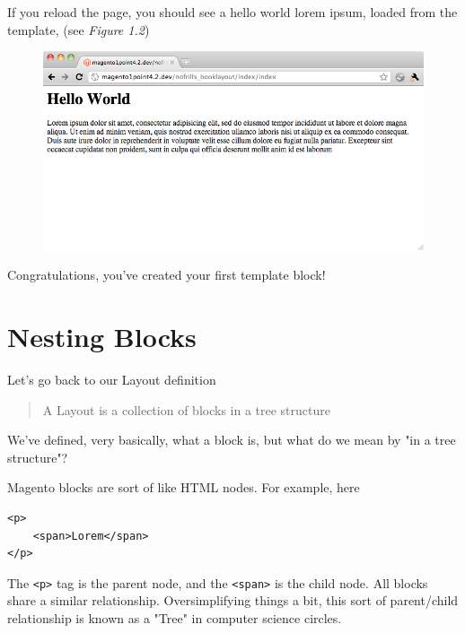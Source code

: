 \documentclass[oneside]{book}
\begin{document}
If you reload the page, you should see a hello world lorem ipsum, loaded from the template, (see \emph{Figure 1.2})

\begin{figure}[htb]
\begin{center}
\leavevmode
\includegraphics[width=1\textwidth]{images/chapter1/helloworld.png}
\end{center}
\caption{}
\end{figure}


Congratulations, you've created your first template block!

\section{Nesting Blocks}

Let's go back to our Layout definition

\begin{quote}
A Layout is a collection of blocks in a tree structure
\end{quote}

We've defined, very basically, what a block is, but what do we mean by "in a tree structure"?

Magento blocks are sort of like HTML nodes.  For example, here

\begin{lstlisting}
<p>
    <span>Lorem</span>
</p>

\end{lstlisting}


The \footnotesize\texttt{\textless p\textgreater } \normalsize  tag is the parent node, and the \footnotesize\texttt{\textless span\textgreater } \normalsize  is the child node.  All blocks share a similar relationship.  Oversimplifying things a bit, this sort of parent/child relationship is known as a "Tree" in computer science circles.
\end{document}
